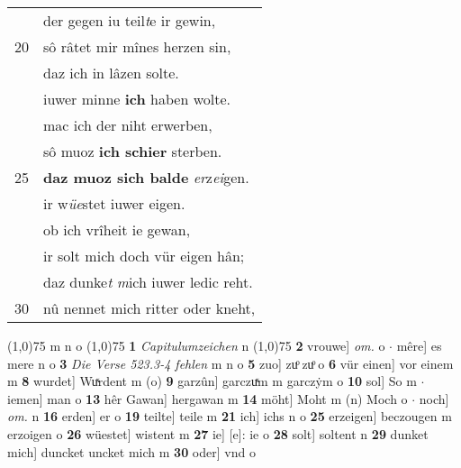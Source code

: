 \documentclass[8pt,a4paper,notitlepage]{article}
\begin{document}
\begin{table}[ht]
\begin{minipage}[t]{0.5\linewidth}
\begin{tabular}{rl}
 & der gegen iu teil\textit{t}e ir gewin,\\ 
20 & sô râtet mir mînes herzen sin,\\ 
 & daz ich in lâzen solte.\\ 
 & iuwer minne \textbf{ich} haben wolte.\\ 
 & mac ich der niht erwerben,\\ 
 & sô muoz \textbf{ich schier} sterben.\\ 
25 & \textbf{daz muoz sich balde} \textit{er}z\textit{ei}gen.\\ 
 & ir w\textit{üe}stet iuwer eigen.\\ 
 & ob ich vrîheit ie gewan,\\ 
 & ir solt mich doch vür eigen hân;\\ 
 & daz dunke\textit{t} \textit{m}ich iuwer ledic reht.\\ 
30 & nû nennet mich ritter oder kneht,\\ 
\end{tabular}
\scriptsize
\line(1,0){75} \newline
m n o \newline
\line(1,0){75} \newline
\textbf{1} \textit{Capitulumzeichen} n  \newline
\line(1,0){75} \newline
\textbf{2} vrouwe] \textit{om.} o  $\cdot$ mêre] es mere n o \textbf{3} \textit{Die Verse 523.3-4 fehlen} m n o  \textbf{5} zuo] zuͦ zuͦ o \textbf{6} vür einen] vor einem m \textbf{8} wurdet] Wuͯrdent m (o) \textbf{9} garzûn] garczuͯm m garczẏm o \textbf{10} sol] So m  $\cdot$ iemen] man o \textbf{13} hêr Gawan] hergawan m \textbf{14} möht] Moht m (n) Moch o  $\cdot$ noch] \textit{om.} n \textbf{16} erden] er o \textbf{19} teilte] teile m \textbf{21} ich] ichs n o \textbf{25} erzeigen] beczougen m erzoigen o \textbf{26} wüestet] wistent m \textbf{27} ie] [e]: ie o \textbf{28} solt] soltent n \textbf{29} dunket mich] duncket uncket mich m \textbf{30} oder] vnd o \newline
\end{minipage}
\end{table}
\newpage
\end{document}
